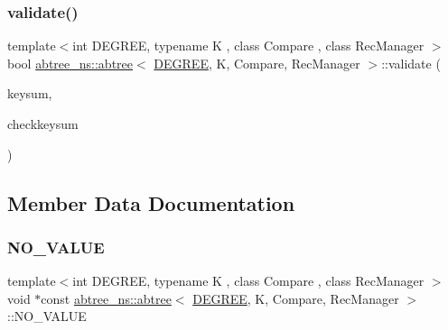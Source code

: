 \mbox{\label{classabtree__ns_1_1abtree_afb8fab7fb71a7181ab344faf8187605c}} 
\subsubsection{\texorpdfstring{validate()}{validate()}\hspace{0.1cm}{\footnotesize\ttfamily [2/2]}}
{\footnotesize\ttfamily template$<$int D\+E\+G\+R\+EE, typename K , class Compare , class Rec\+Manager $>$ \\
bool \hyperlink{classabtree__ns_1_1abtree}{abtree\+\_\+ns\+::abtree}$<$ \hyperlink{brown__sigouin__abtree__kcas_2adapter_8h_a5d88b17d70c985f2f2b8e987037fd6dd}{D\+E\+G\+R\+EE}, K, Compare, Rec\+Manager $>$\+::validate (\begin{DoxyParamCaption}\item[{const long long}]{keysum,  }\item[{const bool}]{checkkeysum }\end{DoxyParamCaption})\hspace{0.3cm}{\ttfamily [inline]}}



\subsection{Member Data Documentation}
\mbox{\label{classabtree__ns_1_1abtree_a2dc9189b41d67210137ac6b11bd0a780}} 
\subsubsection{\texorpdfstring{N\+O\+\_\+\+V\+A\+L\+UE}{NO\_VALUE}}
{\footnotesize\ttfamily template$<$int D\+E\+G\+R\+EE, typename K , class Compare , class Rec\+Manager $>$ \\
void $\ast$const \hyperlink{classabtree__ns_1_1abtree}{abtree\+\_\+ns\+::abtree}$<$ \hyperlink{brown__sigouin__abtree__kcas_2adapter_8h_a5d88b17d70c985f2f2b8e987037fd6dd}{D\+E\+G\+R\+EE}, K, Compare, Rec\+Manager $>$\+::N\+O\+\_\+\+V\+A\+L\+UE}


